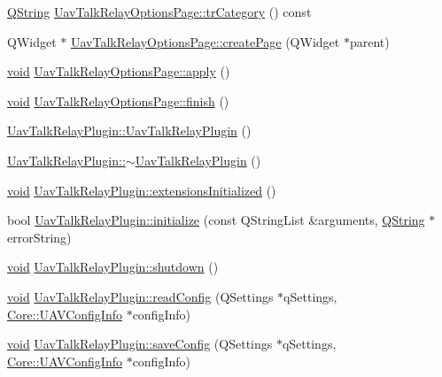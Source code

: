 \begin{DoxyCompactItemize}
\item 
\hyperlink{group___u_a_v_objects_plugin_gab9d252f49c333c94a72f97ce3105a32d}{Q\-String} \hyperlink{group___u_a_v_talk_ga06b96ea896336a6b5cbf6431a19b60f7}{Uav\-Talk\-Relay\-Options\-Page\-::tr\-Category} () const 
\item 
Q\-Widget $\ast$ \hyperlink{group___u_a_v_talk_ga07ae0ea88536d2fd82f9f9ddb84cb3cc}{Uav\-Talk\-Relay\-Options\-Page\-::create\-Page} (Q\-Widget $\ast$parent)
\item 
\hyperlink{group___u_a_v_objects_plugin_ga444cf2ff3f0ecbe028adce838d373f5c}{void} \hyperlink{group___u_a_v_talk_gac14cce3fcdf4dc493bfc8777032d1b41}{Uav\-Talk\-Relay\-Options\-Page\-::apply} ()
\item 
\hyperlink{group___u_a_v_objects_plugin_ga444cf2ff3f0ecbe028adce838d373f5c}{void} \hyperlink{group___u_a_v_talk_ga3c6b3400f3c46755bcc572ba5b76e9af}{Uav\-Talk\-Relay\-Options\-Page\-::finish} ()
\item 
\hyperlink{group___u_a_v_talk_ga425fbe805214fb0a0ec2eb24f6bf0af4}{Uav\-Talk\-Relay\-Plugin\-::\-Uav\-Talk\-Relay\-Plugin} ()
\item 
\hyperlink{group___u_a_v_talk_gaad7159b5c609edca5e23031119f623c7}{Uav\-Talk\-Relay\-Plugin\-::$\sim$\-Uav\-Talk\-Relay\-Plugin} ()
\item 
\hyperlink{group___u_a_v_objects_plugin_ga444cf2ff3f0ecbe028adce838d373f5c}{void} \hyperlink{group___u_a_v_talk_ga23c510f5254ca286083d1b3e4a732582}{Uav\-Talk\-Relay\-Plugin\-::extensions\-Initialized} ()
\item 
bool \hyperlink{group___u_a_v_talk_gacb02c97b971babafb922150887825934}{Uav\-Talk\-Relay\-Plugin\-::initialize} (const Q\-String\-List \&arguments, \hyperlink{group___u_a_v_objects_plugin_gab9d252f49c333c94a72f97ce3105a32d}{Q\-String} $\ast$error\-String)
\item 
\hyperlink{group___u_a_v_objects_plugin_ga444cf2ff3f0ecbe028adce838d373f5c}{void} \hyperlink{group___u_a_v_talk_ga2a3c3d63a751ae8931cfbd8cf30792ba}{Uav\-Talk\-Relay\-Plugin\-::shutdown} ()
\item 
\hyperlink{group___u_a_v_objects_plugin_ga444cf2ff3f0ecbe028adce838d373f5c}{void} \hyperlink{group___u_a_v_talk_ga56f6231aec2bb6b547cd07b4533cb949}{Uav\-Talk\-Relay\-Plugin\-::read\-Config} (Q\-Settings $\ast$q\-Settings, \hyperlink{class_core_1_1_u_a_v_config_info}{Core\-::\-U\-A\-V\-Config\-Info} $\ast$config\-Info)
\item 
\hyperlink{group___u_a_v_objects_plugin_ga444cf2ff3f0ecbe028adce838d373f5c}{void} \hyperlink{group___u_a_v_talk_ga36180ad0b7197a844dfe5ff50a116aa1}{Uav\-Talk\-Relay\-Plugin\-::save\-Config} (Q\-Settings $\ast$q\-Settings, \hyperlink{class_core_1_1_u_a_v_config_info}{Core\-::\-U\-A\-V\-Config\-Info} $\ast$config\-Info)
\end{DoxyCompactItemize}
